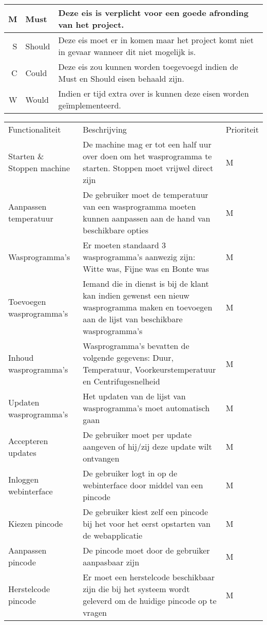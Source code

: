 \begin{tabular}{ r  l p{9cm} }
\hline
M & Must & Deze eis is verplicht voor een goede afronding van het project. \\
\hline
S & Should & Deze eis moet er in komen maar het project komt niet in gevaar wanneer dit niet mogelijk is. \\
\hline
C & Could & Deze eis zou kunnen worden toegevoegd indien de Must en Should eisen behaald zijn. \\
\hline
W & Would & Indien er tijd extra over is kunnen deze eisen worden geïmplementeerd. \\
\end{tabular}

\begin{longtable}{ p{3cm} p{7cm} l }
Functionaliteit & Beschrijving & Prioriteit \\
Starten \& Stoppen machine & De machine mag er tot een half uur over doen om het wasprogramma te starten. Stoppen moet vrijwel direct zijn & M \\
Aanpassen temperatuur & De gebruiker moet de temperatuur van een wasprogramma moeten kunnen aanpassen aan de hand van beschikbare opties & M \\
Wasprogramma's & Er moeten standaard 3 wasprogramma's aanwezig zijn: Witte was, Fijne was en Bonte was & M \\
Toevoegen wasprogramma's & Iemand die in dienst is bij de klant kan indien gewenst een nieuw wasprogramma maken en toevoegen aan de lijst van beschikbare wasprogramma's & M \\
Inhoud wasprogramma's & Wasprogramma's bevatten de volgende gegevens: Duur, Temperatuur, Voorkeurstemperatuur en Centrifugesnelheid & M \\
Updaten wasprogramma's & Het updaten van de lijst van wasprogramma's moet automatisch gaan & M \\
Accepteren updates & De gebruiker moet per update aangeven of hij/zij deze update wilt ontvangen & M \\
Inloggen webinterface & De gebruiker logt in op de webinterface door middel van een pincode & M \\
Kiezen pincode & De gebruiker kiest zelf een pincode bij het voor het eerst opstarten van de webapplicatie & M \\
Aanpassen pincode & De pincode moet door de gebruiker aanpasbaar zijn & M \\
Herstelcode pincode & Er moet een herstelcode beschikbaar zijn die bij het systeem wordt geleverd om de huidige pincode op te vragen & M \\

\end{longtable}
